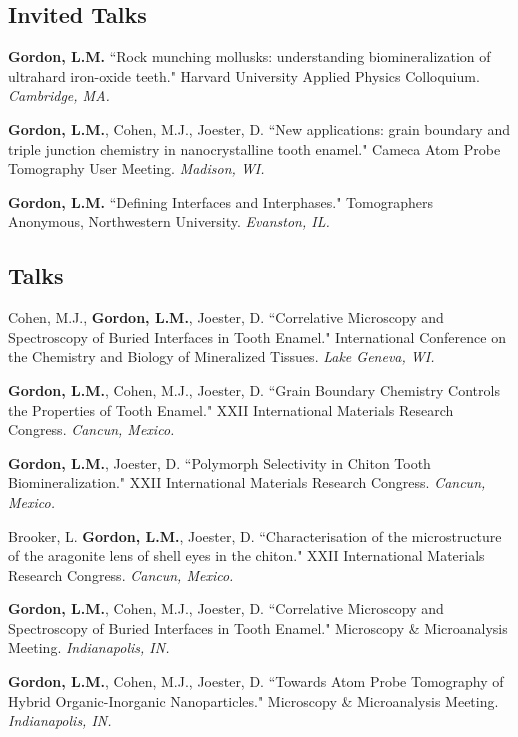 \subsection*{Invited Talks}

\textbf{Gordon, L.M.} ``Rock munching mollusks: understanding biomineralization of ultrahard iron-oxide teeth." Harvard University Applied Physics Colloquium. \emph{Cambridge, MA.}

\begingroup\setlength{\parskip}{0.15cm}
\textbf{Gordon, L.M.}, Cohen, M.J., Joester, D. ``New applications: grain boundary and triple junction chemistry in nanocrystalline tooth enamel." Cameca Atom Probe Tomography User Meeting. \emph{Madison, WI.}

\textbf{Gordon, L.M.} ``Defining Interfaces and Interphases." Tomographers Anonymous, Northwestern University. \emph{Evanston, IL.}

\subsection*{Talks}
Cohen, M.J., \textbf{Gordon, L.M.}, Joester, D. ``Correlative Microscopy and Spectroscopy of Buried Interfaces in Tooth Enamel." International Conference on the Chemistry and Biology of Mineralized Tissues. \emph{Lake Geneva, WI.}
\begingroup\setlength{\parskip}{0.15cm}

\textbf{Gordon, L.M.}, Cohen, M.J., Joester, D. ``Grain Boundary Chemistry Controls the Properties of Tooth Enamel." XXII International Materials Research Congress. \emph{Cancun, Mexico.}

\textbf{Gordon, L.M.}, Joester, D. ``Polymorph Selectivity in Chiton Tooth Biomineralization." XXII International Materials Research Congress. \emph{Cancun, Mexico.}

Brooker, L. \textbf{Gordon, L.M.}, Joester, D. ``Characterisation of the microstructure of the aragonite lens of shell eyes in the chiton." XXII International Materials Research Congress. \emph{Cancun, Mexico.}

\textbf{Gordon, L.M.}, Cohen, M.J., Joester, D. ``Correlative Microscopy and Spectroscopy of Buried Interfaces in Tooth Enamel." Microscopy \& Microanalysis Meeting. \emph{Indianapolis, IN.}

\textbf{Gordon, L.M.}, Cohen, M.J., Joester, D. ``Towards Atom Probe Tomography of Hybrid Organic-Inorganic Nanoparticles." Microscopy \& Microanalysis Meeting. \emph{Indianapolis, IN.}

